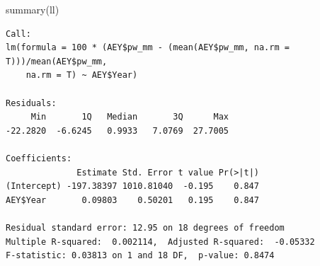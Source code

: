 \documentclass[
  10pt,
  a4paper,oneside]{article}
\newenvironment{Shaded}{\begin{snugshade}}{\end{snugshade}}
\newcommand{\FunctionTok}[1]{\textcolor[rgb]{0.00,0.00,0.00}{#1}}
\newcommand{\NormalTok}[1]{#1}
\begin{document}
\begin{Shaded}
\begin{Highlighting}[]
\FunctionTok{summary}\NormalTok{(ll)}
\end{Highlighting}
\end{Shaded}

\begin{verbatim}
Call:
lm(formula = 100 * (AEY$pw_mm - (mean(AEY$pw_mm, na.rm = T)))/mean(AEY$pw_mm, 
    na.rm = T) ~ AEY$Year)

Residuals:
     Min       1Q   Median       3Q      Max 
-22.2820  -6.6245   0.9933   7.0769  27.7005 

Coefficients:
              Estimate Std. Error t value Pr(>|t|)
(Intercept) -197.38397 1010.81040  -0.195    0.847
AEY$Year       0.09803    0.50201   0.195    0.847

Residual standard error: 12.95 on 18 degrees of freedom
Multiple R-squared:  0.002114,  Adjusted R-squared:  -0.05332 
F-statistic: 0.03813 on 1 and 18 DF,  p-value: 0.8474
\end{verbatim}
\end{document}
